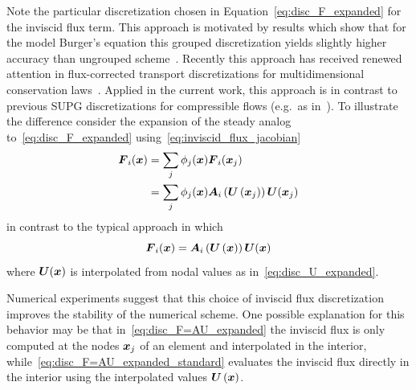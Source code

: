 Note the particular discretization chosen in Equation~\eqref{eq:disc_F_expanded} for the inviscid flux term.  This approach is motivated by results which show that for the model Burger's equation this grouped discretization yields slightly higher accuracy than ungrouped scheme~\cite{fletcher_group_finite_element}.  Recently this approach has received renewed attention in flux-corrected transport discretizations for multidimensional conservation laws~\cite{KuzminMoellerTurek2003b,KuzminTurek2003c}.  Applied in the current work, this approach is in contrast to previous SUPG discretizations for compressible flows (e.g.\ as in~\cite{gjlebeau_thesis,skaliabadi_dissertation,hauke_hughes_compressible_variables,catabriga_coutinho_SUPG_convergence}). To illustrate the difference consider the expansion of the steady analog to~\eqref{eq:disc_F_expanded} using~\eqref{eq:inviscid_flux_jacobian}
\begin{align}
  {\boldsymbol{F}}_i({\boldsymbol{x}}) &= \sum_j \phi_j({\boldsymbol{x}}) {\boldsymbol{F}}_i({\boldsymbol{x}}_j) \nonumber \\
                     &= \sum_j \phi_j({\boldsymbol{x}}) {\boldsymbol{A}}_i\left({\boldsymbol{U}}\left({\boldsymbol{x}}_j\right)\right){\boldsymbol{U}}({\boldsymbol{x}}_j) \label{eq:disc_F=AU_expanded}
\end{align}
in contrast to the typical approach in which
\begin{equation}
  {\boldsymbol{F}}_i({\boldsymbol{x}}) = {\boldsymbol{A}}_i\left({\boldsymbol{U}}\left({\boldsymbol{x}}\right)\right){\boldsymbol{U}}({\boldsymbol{x}}) \label{eq:disc_F=AU_expanded_standard}
\end{equation}
where ${\boldsymbol{U}}({\boldsymbol{x}})$ is interpolated from nodal values as in~\eqref{eq:disc_U_expanded}.

Numerical experiments suggest that this choice of inviscid flux discretization improves the stability of the numerical scheme.  One possible explanation for this behavior may be that in~\eqref{eq:disc_F=AU_expanded} the inviscid flux is only computed at the nodes ${\boldsymbol{x}}_j$ of an element and interpolated in the interior, while~\eqref{eq:disc_F=AU_expanded_standard} evaluates the inviscid flux directly in the interior using the interpolated values ${\boldsymbol{U}}\left({\boldsymbol{x}}\right)$.

